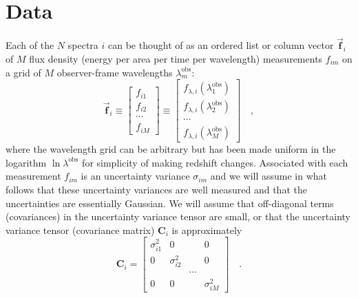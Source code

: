 \documentclass[12pt]{article}
\newcommand{\hoggvector}[1]{\boldsymbol{\vec{#1}}}
\newcommand{\fvec}{\hoggvector{f}}
\newcommand{\hoggmatrix}[1]{\boldsymbol{#1}}
\newcommand{\Cmatrix}{\hoggmatrix{C}}
\begin{document}
\section{Data}

Each of the $N$ spectra $i$ can be thought of as an ordered list or
column vector $\fvec_i$ of $M$ flux density (energy per area per time
per wavelength) measurements $f_{im}$ on a grid of $M$ observer-frame
wavelengths $\lambda^{\mathrm{obs}}_m$:
\begin{equation}
\fvec_i
\equiv \left[\begin{array}{c} f_{i1} \\
                              f_{i2} \\
                              \cdots \\
                              f_{iM} \end{array}\right]
\equiv \left[\begin{array}{c} f_{\lambda,i}(\lambda^{\mathrm{obs}}_1) \\
                              f_{\lambda,i}(\lambda^{\mathrm{obs}}_2) \\
                                                \cdots \\
                              f_{\lambda,i}(\lambda^{\mathrm{obs}}_M) \end{array}\right]
\quad ,
\end{equation}
where the wavelength grid can be arbitrary but has been made uniform in
the logarithm $\ln\lambda^{\mathrm{obs}}$ for simplicity of making
redshift changes.  Associated with each measurement $f_{im}$ is an
uncertainty variance $\sigma_{im}$ and we will assume in what follows
that these uncertainty variances are well measured and that the
uncertainties are essentially Gaussian.  We will assume that
off-diagonal terms (covariances) in the uncertainty variance tensor
are small, or that the uncertainty variance tensor (covariance matrix)
$\Cmatrix_i$ is approximately
\begin{equation}
\Cmatrix_i =
 \left[\begin{array}{cccc} \sigma_{i1}^2 & 0 & & 0 \\
                           0 & \sigma_{i2}^2 & & 0 \\
                           & & \cdots & \\
                           0 & 0 & & \sigma_{iM}^2 \end{array}\right]
\quad .
\end{equation}
\end{document}
